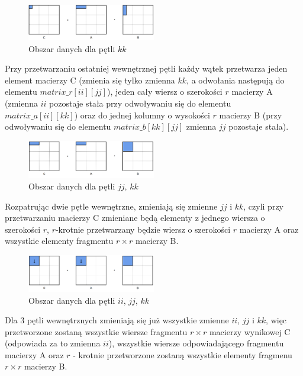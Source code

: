 \documentclass[10pt,a4paper]{article}
\begin{document}
\begin{figure}[h]
	\centering
	\includegraphics[width=0.5\textwidth]{6loops1.png}
	\caption{Obszar danych dla pętli $kk$}
\end{figure}

Przy przetwarzaniu ostatniej wewnętrznej pętli każdy wątek przetwarza jeden element macierzy C (zmienia się tylko zmienna $kk$, a odwołania następują do
elementu $matrix\_r[ii][jj]$), jeden cały wiersz o szerokości $r$ macierzy A (zmienna $ii$ pozostaje stała przy odwoływaniu się do elementu $matrix\_a[ii][kk]$) oraz
do jednej kolumny o wysokości $r$ macierzy B (przy odwoływaniu się do elementu $matrix\_b[kk][jj]$ zmienna $jj$ pozostaje stała).

\begin{figure}[h]
	\centering
	\includegraphics[width=0.5\textwidth]{6loops2.png}
	\caption{Obszar danych dla pętli $jj$, $kk$}
\end{figure}

Rozpatrując dwie pętle wewnętrzne, zmieniają się zmienne $jj$ i $kk$, czyli przy przetwarzaniu macierzy C zmieniane będą elementy z jednego wiersza
o szerokości $r$, $r$-krotnie przetwarzany będzie wiersz o szerokości $r$ macierzy A oraz wszystkie elementy fragmentu $r \times r$ macierzy B.

\begin{figure}[h]
	\centering
	\includegraphics[width=0.5\textwidth]{6loops3.png}
	\caption{Obszar danych dla pętli $ii$, $jj$, $kk$}
\end{figure}

Dla 3 pętli wewnętrznych zmieniają się już wszystkie zmienne $ii$, $jj$ i $kk$, więc przetworzone zostaną wszystkie wiersze fragmentu $r \times r$
macierzy wynikowej C (odpowiada za to zmienna $ii$), wszystkie wiersze odpowiadającego fragmentu macierzy A oraz $r$ - krotnie przetworzone zostaną
wszystkie elementy fragmenu $r \times r$ macierzy B. \\
\end{document}
